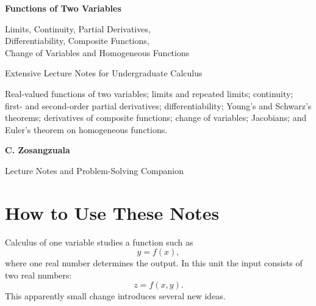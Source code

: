 \documentclass[11pt,oneside]{book}
\theoremstyle{studentthm}
\theoremstyle{definition}
\begin{document}
\begin{titlepage}
\centering
\vspace*{2.0cm}

{\Huge\bfseries\color{DeepBlue}
Functions of Two Variables\par}

\vspace{0.35cm}

{\LARGE
Limits, Continuity, Partial Derivatives,\\
Differentiability, Composite Functions,\\
Change of Variables and Homogeneous Functions\par}

\vspace{1.25cm}

{\large
Extensive Lecture Notes for Undergraduate Calculus\par}

\vspace{0.9cm}

{\large
Real-valued functions of two variables; limits and repeated limits;
continuity; first- and second-order partial derivatives;
differentiability; Young's and Schwarz's theorems;
derivatives of composite functions; change of variables;
Jacobians; and Euler's theorem on homogeneous functions.\par}

\vfill

{\Large\bfseries C. Zosangzuala\par}
\vspace{0.25cm}
{\large Lecture Notes and Problem-Solving Companion\par}

\vspace{1cm}
\end{titlepage}

\frontmatter
\tableofcontents

\chapter*{How to Use These Notes}

Calculus of one variable studies a function such as
\[
y=f(x),
\]
where one real number determines the output. In this unit the input
consists of two real numbers:
\[
z=f(x,y).
\]
This apparently small change introduces several new ideas.
\end{document}
